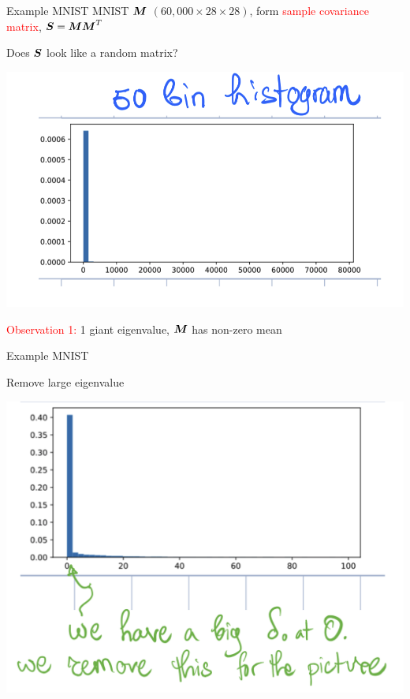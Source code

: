 \documentclass[10pt]{beamer}
\begin{document}
\begin{frame}{Example MNIST}
    MNIST ${\boldsymbol M}$ $(60,000 \times 28 \times 28)$, form \textcolor{red}{sample covariance matrix}, ${\boldsymbol S} = {\boldsymbol M}{\boldsymbol M}^T$ 
    \begin{center}
        Does ${\boldsymbol S}$ look like a random matrix?
    \end{center}
    \pause
    
    \vspace{0.2cm}
    
    \begin{center}
        \includegraphics[scale = 0.5]{part-2-images/MNIST_1.png}
    \end{center}
    \begin{center}
        \textcolor{red}{Observation 1:} 1 giant eigenvalue, ${\boldsymbol M}$ has non-zero mean
    \end{center}
\end{frame}

\begin{frame}{Example MNIST}
\begin{center}
    Remove large eigenvalue
\end{center}

    \begin{center}
        \includegraphics[scale = 0.4]{part-2-images/MNIST_2.png}
    \end{center}
\end{frame}
\end{document}
